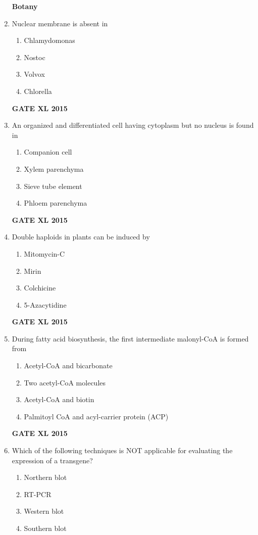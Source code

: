 \documentclass[journal,12pt,onecolumn]{IEEEtran}
\begin{document}
\begin{enumerate}
	\textbf{Botany}
\item Nuclear membrane is absent in
    \begin{enumerate}
            \item Chlamydomonas
	    \item Nostoc
	    \item Volvox
            \item Chlorella
    \end{enumerate}
\hfill{\textbf{GATE XL 2015}}
\item An organized and differentiated cell having cytoplasm but no nucleus is found in
    \begin{enumerate}
            \item Companion cell
	    \item Xylem parenchyma
	    \item Sieve tube element
            \item Phloem parenchyma
    \end{enumerate}
\hfill{\textbf{GATE XL 2015}}
\item Double haploids in plants can be induced by
    \begin{enumerate}
            \item Mitomycin-C
	    \item Mirin
	    \item Colchicine
            \item 5-Azacytidine
    \end{enumerate}
\hfill{\textbf{GATE XL 2015}}
\item During fatty acid biosynthesis, the first intermediate malonyl-CoA is formed from 
    \begin{enumerate}
            \item Acetyl-CoA and bicarbonate
	    \item Two acetyl-CoA molecules
	    \item Acetyl-CoA and biotin
	    \item  Palmitoyl CoA and acyl-carrier protein (ACP)
	\end{enumerate}
\hfill{\textbf{GATE XL 2015}}
\item  Which of the following techniques is NOT applicable for evaluating the expression of a transgene?
        \begin{enumerate} 
            \item Northern blot
	    \item RT-PCR
	    \item Western blot
            \item Southern blot

\end{enumerate}
\end{enumerate}
\end{document}
